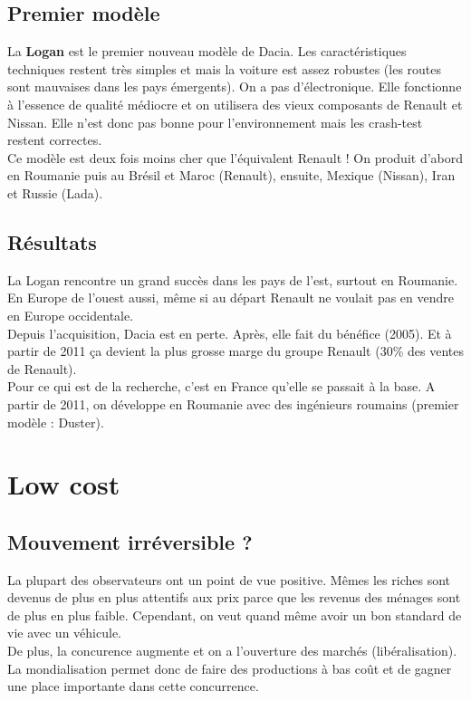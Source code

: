 \subsection{Premier modèle}
La \textbf{Logan} est le premier nouveau modèle de Dacia. Les caractéristiques techniques restent très simples et mais la voiture est assez robustes (les routes sont mauvaises dans les pays émergents). On a pas d'électronique. Elle fonctionne à l'essence de qualité médiocre et on utilisera des vieux composants de Renault et Nissan. Elle n'est donc pas bonne pour l'environnement mais les crash-test restent correctes.\\
Ce modèle est deux fois moins cher que l'équivalent Renault ! On produit d'abord en Roumanie puis au Brésil et Maroc (Renault), ensuite, Mexique (Nissan), Iran et Russie (Lada).

\subsection{Résultats}
La Logan rencontre un grand succès dans les pays de l'est, surtout en Roumanie. En Europe de l'ouest aussi, même si au départ Renault ne voulait pas en vendre en Europe occidentale. \\
Depuis l'acquisition, Dacia est en perte. Après, elle fait du bénéfice (2005). Et à partir de 2011 ça devient la plus grosse marge du groupe Renault (30\% des ventes de Renault). \\
Pour ce qui est de la recherche, c'est en France qu'elle se passait à la base. A partir de 2011, on développe en Roumanie avec des ingénieurs roumains (premier modèle : Duster).

\section{Low cost}
\subsection{Mouvement irréversible ?}
La plupart des observateurs ont un point de vue positive. Mêmes les riches sont devenus de plus en plus attentifs aux prix parce que les revenus des ménages sont de plus en plus faible. Cependant, on veut quand même avoir un bon standard de vie avec un véhicule.\\
De plus, la concurence augmente et on a l'ouverture des marchés (libéralisation). La mondialisation permet donc de faire des productions à bas coût et de gagner une place importante dans cette concurrence.

